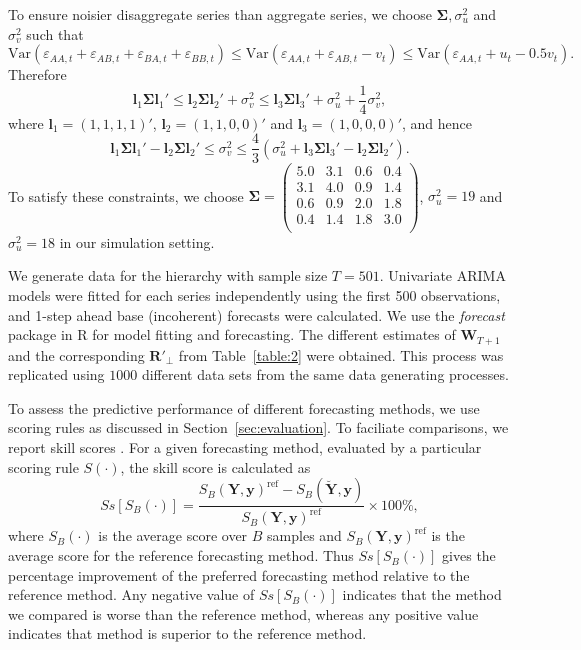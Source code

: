 \documentclass[a4paper, 11pt]{article}
\theoremstyle{theo}
\theoremstyle{definition}
\begin{document}
To ensure noisier disaggregate series than aggregate series, we choose $\bm{\Sigma}, \sigma^2_u$ and $\sigma^2_v$ such that
$$
\text{Var}(\varepsilon_{AA,t}+\varepsilon_{AB,t}+\varepsilon_{BA,t}+\varepsilon_{BB,t}) \le \text{Var}(\varepsilon_{AA,t}+\varepsilon_{AB,t}-v_t) \le \text{Var}(\varepsilon_{AA,t}+u_t-0.5v_t).
$$
Therefore
$$
\bm{l}_1\bm{\Sigma} \bm{l}_1' \le \bm{l}_2\bm{\Sigma} \bm{l}_2' + \sigma^2_v \le  \bm{l}_3\bm{\Sigma} \bm{l}_3' + \sigma^2_u + \frac{1}{4}\sigma^2_v,
$$
where $\bm{l}_1 = (1,1,1,1)'$, $\bm{l}_2 = (1,1,0,0)'$ and $\bm{l}_3 = (1,0,0,0)'$, and hence
$$\bm{l}_1\bm{\Sigma} \bm{l}_1' - \bm{l}_2\bm{\Sigma} \bm{l}_2' \le \sigma^2_v \le \frac{4}{3}(\sigma^2_u + \bm{l}_3\bm{\Sigma} \bm{l}_3' - \bm{l}_2\bm{\Sigma} \bm{l}_2').$$
To satisfy these constraints, we choose
$\bm{\Sigma} =
\begin{pmatrix}
5.0 & 3.1 & 0.6 & 0.4 \\
3.1 & 4.0 & 0.9 & 1.4 \\
0.6 & 0.9 & 2.0 & 1.8 \\
0.4 & 1.4 & 1.8 & 3.0 \\
\end{pmatrix}$,
$\sigma^2_u = 19$ and $\sigma^2_u = 18$ in our simulation setting.

We generate data for the hierarchy with sample size $T=501$. Univariate ARIMA models were fitted for each series independently using the first 500 observations, and 1-step ahead base (incoherent) forecasts were calculated. We use the \textit{forecast} package \citep{hyndman2017forecasting} in R \citep{Rcore} for model fitting and forecasting. The different estimates of $\bm{W}_{T+1}$ and the corresponding $\bm{R}'_\bot$ from Table~\ref{table:2} were obtained. This process was replicated using $1000$ different data sets from the same data generating processes.

To assess the predictive performance of different forecasting methods, we use scoring rules as discussed in Section~\ref{sec:evaluation}. To faciliate comparisons, we report skill scores \citep{Gneiting2007}. For a given forecasting method, evaluated by a particular scoring rule $S(\cdot)$, the skill score is calculated as
\begin{equation}
Ss[S_B(\cdot)] = \frac{S_B(\bm{Y},\bm{y})^{\text{ref}} - S_B(\breve{\bm{Y}},\bm{y})}{S_B(\bm{Y},\bm{y})^{\text{ref}}}\times 100\%,
\end{equation}
where $S_B(\cdot)$ is the average score over $B$ samples and $S_B(\bm{Y},\bm{y})^{\text{ref}}$ is the average score for the reference forecasting method. Thus $Ss[S_B(\cdot)]$ gives the percentage improvement of the preferred forecasting method relative to the reference method. Any negative value of $Ss[S_B(\cdot)]$ indicates that the method we compared is worse than the reference method, whereas any positive value indicates that method is superior to the reference method.
\end{document}
